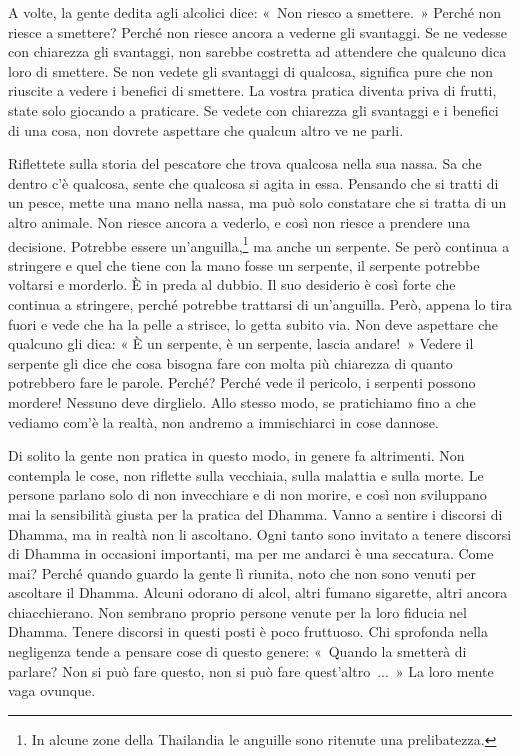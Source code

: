 A volte, la gente dedita agli alcolici dice: «~Non riesco a smettere.~»
Perché non riesce a smettere? Perché non riesce ancora a vederne gli
svantaggi. Se ne vedesse con chiarezza gli svantaggi, non sarebbe
costretta ad attendere che qualcuno dica loro di smettere. Se non vedete
gli svantaggi di qualcosa, significa pure che non riuscite a vedere i
benefici di smettere. La vostra pratica diventa priva di frutti, state
solo giocando a praticare. Se vedete con chiarezza gli svantaggi e i
benefici di una cosa, non dovrete aspettare che qualcun altro ve ne
parli.

Riflettete sulla storia del pescatore che trova qualcosa nella sua
nassa. Sa che dentro c'è qualcosa, sente che qualcosa si agita in essa.
Pensando che si tratti di un pesce, mette una mano nella nassa, ma può
solo constatare che si tratta di un altro animale. Non riesce ancora a
vederlo, e così non riesce a prendere una decisione. Potrebbe essere
un'anguilla,\footnote{In alcune zone della Thailandia le anguille sono
  ritenute una prelibatezza.} ma anche un serpente. Se però continua a
stringere e quel che tiene con la mano fosse un serpente, il serpente
potrebbe voltarsi e morderlo. È in preda al dubbio. Il suo desiderio è
così forte che continua a stringere, perché potrebbe trattarsi di
un'anguilla. Però, appena lo tira fuori e vede che ha la pelle a
strisce, lo getta subito via. Non deve aspettare che qualcuno gli dica:
« È un serpente, è un serpente, lascia andare!~» Vedere il serpente gli
dice che cosa bisogna fare con molta più chiarezza di quanto potrebbero
fare le parole. Perché? Perché vede il pericolo, i serpenti possono
mordere! Nessuno deve dirglielo. Allo stesso modo, se pratichiamo fino a
che vediamo com'è la realtà, non andremo a immischiarci in cose dannose.

Di solito la gente non pratica in questo modo, in genere fa altrimenti.
Non contempla le cose, non riflette sulla vecchiaia, sulla malattia e
sulla morte. Le persone parlano solo di non invecchiare e di non morire,
e così non sviluppano mai la sensibilità giusta per la pratica del
Dhamma. Vanno a sentire i discorsi di Dhamma, ma in realtà non li
ascoltano. Ogni tanto sono invitato a tenere discorsi di Dhamma in
occasioni importanti, ma per me andarci è una seccatura. Come mai?
Perché quando guardo la gente lì riunita, noto che non sono venuti per
ascoltare il Dhamma. Alcuni odorano di alcol, altri fumano sigarette,
altri ancora chiacchierano. Non sembrano proprio persone venute per la
loro fiducia nel Dhamma. Tenere discorsi in questi posti è poco
fruttuoso. Chi sprofonda nella negligenza tende a pensare cose di questo
genere: «~Quando la smetterà di parlare? Non si può fare questo, non si
può fare quest'altro~...~» La loro mente vaga ovunque.

